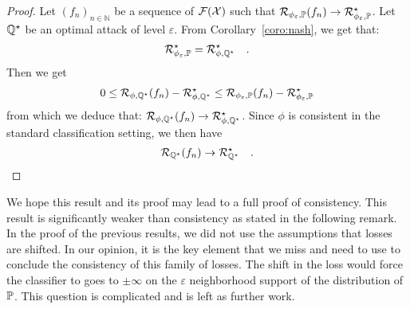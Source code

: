 \begin{proof}
Let $(f_n)_{n\in\mathbb{N}}$ be a sequence of $\mathcal{F}(\mathcal{X})$ such that $\mathcal{R}_{\phi_\varepsilon,\mathbb{P}}(f_n)\to\mathcal{R}_{\phi_\varepsilon,\mathbb{P}}^\star$. Let $\mathbb{Q}^\star$ be an optimal attack of level $\varepsilon$. From Corollary~\ref{coro:nash}, we get that:
\begin{align*}
    \mathcal{R}_{\phi_\varepsilon,\mathbb{P}}^\star =   \mathcal{R}_{\phi,\mathbb{Q}^\star}^\star\quad.
\end{align*} Then we get 
\begin{align*}
   0\leq \mathcal{R}_{\phi,\mathbb{Q}^\star}(f_n)- \mathcal{R}_{\phi,\mathbb{Q}^\star}^\star \leq \mathcal{R}_{\phi_\varepsilon,\mathbb{P}}(f_n)-\mathcal{R}_{\phi_\varepsilon,\mathbb{P}}^\star
\end{align*}
from which we deduce that: $\mathcal{R}_{\phi,\mathbb{Q}^\star}(f_n)\to \mathcal{R}_{\phi,\mathbb{Q}^\star}^\star$. Since $\phi$ is consistent in the standard classification setting, we then have     
\begin{align*}
    \mathcal{R}_{\mathbb{Q}^\star}(f_n)\to \mathcal{R}_{\mathbb{Q}^\star}^\star\quad.
\end{align*}
\end{proof}
 

We hope this result and its proof may lead to a full proof of consistency. This result is significantly weaker than consistency as stated in the following remark. In the proof of the previous results, we did not use the assumptions that losses are shifted. In our opinion, it is the key element that we miss and need to use to conclude the consistency of this family of losses. The shift in the loss would force the classifier to goes to $\pm \infty$ on the $\varepsilon$ neighborhood support of the distribution of $\mathbb{P}$. This question is complicated and is left as further work.  
